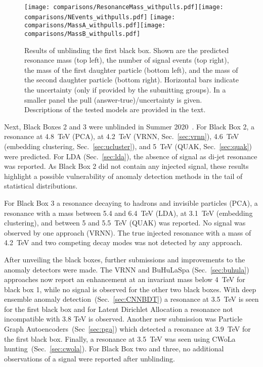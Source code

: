 \documentclass[a4paper,11pt]{article}
\begin{document}
\begin{figure}[h!]
\centering
\texttt{[image: comparisons/ResonanceMass\_withpulls.pdf]}\texttt{[image: comparisons/NEvents\_withpulls.pdf]}
\texttt{[image: comparisons/MassA\_withpulls.pdf]}\texttt{[image: comparisons/MassB\_withpulls.pdf]}
\caption{Results of unblinding the first black box. Shown are the predicted resonance mass (top left), the number of signal events (top right), the mass of the first daughter particle (bottom left), and the mass of the second daughter particle (bottom right). Horizontal bars indicate the uncertainty (only if provided by the submitting groups). In a smaller panel the pull (answer-true)/uncertainty is given. Descriptions of the tested models are provided in the text.}
\label{fig:bb1res}
\end{figure}

Next, Black Boxes 2 and 3 were unblinded in 
Summer 2020~\cite{summerolympics}.
For Black Box 2, a resonance at 4.8~TeV (PCA),
at 4.2~TeV (VRNN, Sec.~\ref{sec:vrnn}), 
4.6~TeV (embedding clustering, Sec.~\ref{sec:ucluster}), and 5~TeV (QUAK, Sec.~\ref{sec:quak}) were predicted. 
For LDA (Sec.~\ref{sec:lda}), the absence of signal as di-jet resonance was reported. As Black Box 2 did not contain any injected signal, these results highlight a possible vulnerability of anomaly detection methods in the tail of statistical distributions.

For Black Box 3 a resonance decaying to hadrons and invisible particles (PCA), 
a resonance with a mass between 5.4 and 6.4~TeV (LDA),
at 3.1~TeV (embedding clustering), and
between 5 and 5.5~TeV (QUAK)
was reported. No signal was observed by one approach (VRNN). The true injected resonance with a mass of 4.2~TeV and two competing decay modes was not detected by any approach.

After unveiling the black boxes, further submissions and improvements to the anomaly detectors were made.
The VRNN and BuHuLaSpa (Sec.~\ref{sec:buhula}) approaches now report an enhancement at an invariant mass below 4~TeV for black box 1, while no signal
is observed for the other two black boxes. With deep ensemble anomaly detection~(Sec.~\ref{sec:CNNBDT}) a resonance at 3.5~TeV is seen
for the first black box and for Latent Dirichlet Allocation a resonance not incompatible with 3.8 TeV is observed.
Another new submission was Particle Graph Autoencoders~(Sec~\ref{sec:pga}) which detected a resonance at 3.9~TeV for the first black box.
Finally, a resonance at 3.5~TeV was seen using CWoLa hunting~(Sec.~\ref{sec:cwola}). For Black Box two and three, no additional observations of a signal
were reported after unblinding.
\end{document}
